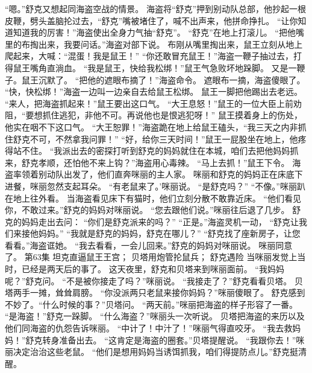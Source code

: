 \documentclass[a4paper,12pt,UTF8,twoside]{ctexbook}
\begin{document}
        “嗯。”舒克又想起同海盗空战的情景。 
        海盗将“舒克”押到别动队总部，他抄起一根皮鞭，劈头盖脑抡过去，“舒克”嘴被堵住了，喊不出声来，他拼命挣扎。 
        “让你知道知道我的厉害！”海盗使出全身力气抽“舒克”。 
      “舒克”在地上打滚儿。 
      “把他嘴里的布掏出来，我要问话。”海盗对部下说。 
        布刚从嘴里掏出来，鼠王立刻从地上爬起来，大喊：“混蛋！我是鼠王！” 
        “你还敢冒充鼠王！”海盗一鞭子抽过去，打得鼠王嘴角直淌血。 
        “我是鼠王，快给我松绑！”鼠王气急败坏地跺脚。 
        又是一鞭子。鼠王沉默了。 
        “把他的遮眼布摘了！”海盗命令。 
        遮眼布一摘，海盗傻眼了。 
        “快，快松绑！”海盗一边叫一边亲自去给鼠王松绑。 
        鼠王一脚把他踢出去老远。 
        “来人，把海盗抓起来！”鼠王要出这口气。 
        “大王息怒！”鼠王的一位大臣上前劝阻，“要想抓住逃犯，非他不可。再说他也是恨逃犯呀！” 
        鼠王摸着身上的伤处，他实在咽不下这口气。 
        “大王恕罪！”海盗跪在地上给鼠王磕头，“我三天之内非抓住舒克不可，不然拿我问罪！” 
        “好，给你三天时间！”鼠王一屁股坐在地上，他疼得站不住。 
        “我派出去的密探打听到舒克的妈妈就住在本城，咱们去把他妈妈抓来，舒克孝顺，还怕他不来上钩？”海盗用心毒辣。 
        “马上去抓！”鼠王下令。 
        海盗率领着别动队出发了，他们直奔咪丽的主人家。 
        咪丽和舒克的妈妈正在床底下进餐，咪丽忽然支起耳朵。 
        “有老鼠来了。’咪丽说。 
        “是舒克吗？” 
        “不像。”咪丽趴在地上往外看。 
        当海盗看见床下有猫时，他们立刻分散不敢靠近床。 
        “他们看见你，不敢过来。”舒克的妈妈对咪丽说。 
        “您去跟他们说。”咪丽往后退了几步。 
        舒克的妈妈走出去问：  “你们是舒克派来的吗？” 
        “正是。”海盗灵机一动，  “舒克让我们来接他妈妈。” 
        “我就是舒克的妈妈，舒克在哪儿？” 
        “舒克找了座新房子，让您看看。”海盗诓她。 
        “我去看看，一会儿回来。”舒克的妈妈对咪丽说。 
        咪丽同意了。   第63集 
        坦克直逼鼠王王宫； 
        贝塔用炮管抡鼠兵； 
        舒克遇险   
        当咪丽发觉上当时，已经是两天后的事了。 
        这天夜里，舒克和贝塔来到咪丽面前。 
        “我妈妈呢？”舒克问。 
        “不是被你接走了吗？”咪丽说。 
        “我接走了？”舒克看看贝塔。 
        贝塔两手一摊，耸耸肩膀。 
        “你没派两只老鼠来接你妈妈？”咪丽傻眼了。 
        舒克感到不妙了。“什么时候的事？”贝塔问。 
        “两天前。”咪丽把海盗的样子形容了一番。 
        “是海盗！”舒克一跺脚。 
        “什么海盗？”咪丽头一次听说。 
        贝塔把海盗的来历以及他们同海盗的仇怨告诉咪丽。 
        “中计了！中汁了！”咪丽气得直咬牙。 
        “我去救妈妈！”舒克转身准备出去。 
        “这肯定是海盗的圈套。”贝塔提醒说。 
        “我跟你去！”咪丽决定治治这些老鼠。 
        “他们是想用妈妈当诱饵抓我，咱们得提防点儿。”舒克挺清醒。 
\end{document}
